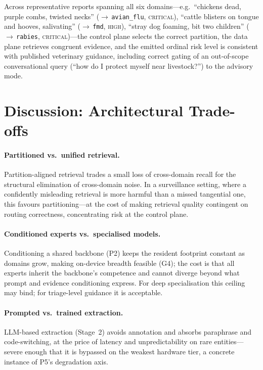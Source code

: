 \documentclass[runningheads]{llncs}
\begin{document}
Across representative reports spanning all six domains---e.g.\ ``chickens dead, purple combs, twisted necks'' ($\rightarrow$\,\texttt{avian\_flu}, \textsc{critical}), ``cattle blisters on tongue and hooves, salivating'' ($\rightarrow$\,\texttt{fmd}, \textsc{high}), ``stray dog foaming, bit two children'' ($\rightarrow$\,\texttt{rabies}, \textsc{critical})---the control plane selects the correct partition, the data plane retrieves congruent evidence, and the emitted ordinal risk level is consistent with published veterinary guidance, including correct gating of an out-of-scope conversational query (``how do I protect myself near livestock?'') to the advisory mode.

\section{Discussion: Architectural Trade-offs}
\label{sec:tradeoffs}

\paragraph{Partitioned vs.\ unified retrieval.}
Partition-aligned retrieval trades a small loss of cross-domain recall for the structural elimination of cross-domain noise. In a surveillance setting, where a confidently misleading retrieval is more harmful than a missed tangential one, this favours partitioning---at the cost of making retrieval quality contingent on routing correctness, concentrating risk at the control plane.

\paragraph{Conditioned experts vs.\ specialised models.}
Conditioning a shared backbone (P2) keeps the resident footprint constant as domains grow, making on-device breadth feasible (G4); the cost is that all experts inherit the backbone's competence and cannot diverge beyond what prompt and evidence conditioning express. For deep specialisation this ceiling may bind; for triage-level guidance it is acceptable.

\paragraph{Prompted vs.\ trained extraction.}
LLM-based extraction (Stage~2) avoids annotation and absorbs paraphrase and code-switching, at the price of latency and unpredictability on rare entities---severe enough that it is bypassed on the weakest hardware tier, a concrete instance of P5's degradation axis.
\end{document}
